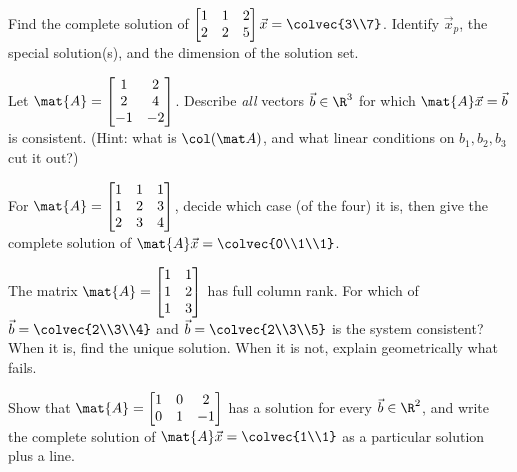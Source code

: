 \begin{exercise}
\label{ch13:ex-pns}
Find the complete solution of
$\begin{bmatrix}1&1&2\\2&2&5\end{bmatrix}\vec{x}=\colvec{3\\7}$. Identify $\vec{x}_p$, the
special solution(s), and the dimension of the solution set.
\end{exercise}

\begin{exercise}
\label{ch13:ex-bvary}
Let $\mat{A}=\begin{bmatrix}1&2\\2&4\\-1&-2\end{bmatrix}$. Describe \emph{all} vectors
$\vec{b}\in\R^3$ for which $\mat{A}\vec{x}=\vec{b}$ is consistent. (Hint: what is
$\col(\mat A)$, and what linear conditions on $b_1,b_2,b_3$ cut it out?)
\end{exercise}

\begin{exercise}
\label{ch13:ex-sq}
For $\mat{A}=\begin{bmatrix}1&1&1\\1&2&3\\2&3&4\end{bmatrix}$, decide which case
(of the four) it is, then give the complete solution of $\mat{A}\vec{x}=\colvec{0\\1\\1}$.
\end{exercise}

\begin{exercise}
\label{ch13:ex-fcr}
The matrix $\mat{A}=\begin{bmatrix}1&1\\1&2\\1&3\end{bmatrix}$ has full column rank. For
which of $\vec{b}=\colvec{2\\3\\4}$ and $\vec{b}=\colvec{2\\3\\5}$ is the system
consistent? When it is, find the unique solution. When it is not, explain geometrically
what fails.
\end{exercise}

\begin{exercise}
\label{ch13:ex-frr}
Show that $\mat{A}=\begin{bmatrix}1&0&2\\0&1&-1\end{bmatrix}$ has a solution for every
$\vec{b}\in\R^2$, and write the complete solution of $\mat{A}\vec{x}=\colvec{1\\1}$ as a
particular solution plus a line.
\end{exercise}

